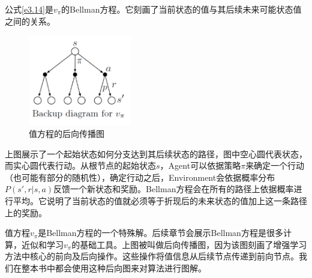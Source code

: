 \documentclass{ctexart}
\begin{document}
            公式\ref{e3.14}是$v_{\pi}$的Bellman方程。它刻画了当前状态的值与其后续未来可能状态值之间的关系。
            \begin{figure}[h]
                \centering
                \includegraphics[width=0.4\textwidth]{f3-1-2}
                \caption{值方程的后向传播图}
                \label{f3_1_2}
            \end{figure}
            上图展示了一个起始状态如何分支达到其后续状态的路径，图中空心圆代表状态，而实心圆代表行动。从根节点的起始状态$s$，Agent可以依据策略$\pi$来确定一个行动（也可能有部分的随机性），确定行动之后，Environment会依据概率分布$P(s',r|s,a)$反馈一个新状态和奖励。Bellman方程会在所有的路径上依据概率进行平均。它说明了当前状态的值就必须等于折现后的未来状态的值加上这一条路径上的奖励。

            值方程$v_{\pi}$是Bellman方程的一个特殊解。后续章节会展示Bellman方程是很多计算，近似和学习$v_{\pi}$的基础工具。上图被叫做后向传播图，因为该图刻画了增强学习方法中核心的前向及后向操作。这些操作将值信息从后续节点传递到前向节点。我们在整本书中都会使用这种后向图来对算法进行图解。
\end{document}
